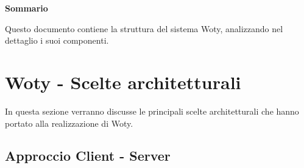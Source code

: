
\newpage

\vspace*{0.5cm} %
\begin{center}

\textbf{{\huge{Sommario}}}

Questo documento contiene la struttura del sistema Woty, analizzando nel dettaglio i suoi componenti.

\vspace*{0.2cm} %

\end{center}






\newpage

\tableofcontents %

\let\cleardoublepage\clearpage %

\listoftables

\listoffigures




\newpage

\section{Woty - Scelte architetturali}
In questa sezione verranno discusse le principali scelte architetturali che hanno portato alla realizzazione di Woty. 

\subsection{Approccio Client - Server}

